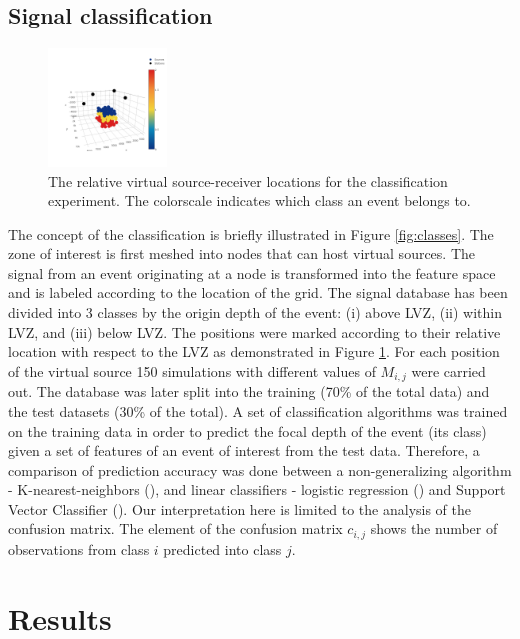 \documentclass[letterpaper,11pt]{article}
\begin{document}
\subsection*{Signal classification}
\begin{figure}
\vspace{-16mm}
\centering
\includegraphics[width=0.28\textwidth]{./AntonBiryukov_bibtex/figure_foxcreek_classes.png}
\vspace{-4mm}
\caption{The relative virtual source-receiver locations for the classification experiment. The colorscale indicates which class an event belongs to.}
\label{fig:foxcreek_classes}
\end{figure}
The concept of the classification is briefly illustrated in Figure \ref{fig:classes}. The zone of interest is first meshed into nodes that can host virtual sources. The signal from an event originating at a node is transformed into the feature space and is labeled according to the location of the grid. The signal database has been divided into 3 classes by the origin depth of the event: (i) above LVZ, (ii) within LVZ, and (iii) below LVZ.
The positions were marked according to their relative location with respect to the LVZ as demonstrated in Figure \ref{fig:foxcreek_classes}. For each position of the virtual source 150 simulations with different values of $M_{i,j}$ were carried out. The database was later split into the training (70\% of the total data) and the test datasets (30\% of the total). 
A set of classification algorithms was trained on the training data in order to predict the focal depth of the event (its class) given a set of features of an event of interest from the test data. Therefore, a comparison of prediction accuracy was done between a non-generalizing algorithm - K-nearest-neighbors (\cite{cover_nearest_1967}), and linear classifiers - logistic regression (\cite{jr_applied_2004}) and Support Vector Classifier (\cite{suykens_least_1999}). Our interpretation here is limited to the analysis of the confusion matrix. The element of the confusion matrix $c_{i,j}$ shows the number of observations from class $i$ predicted into class $j$.
\section*{Results}
\end{document}
